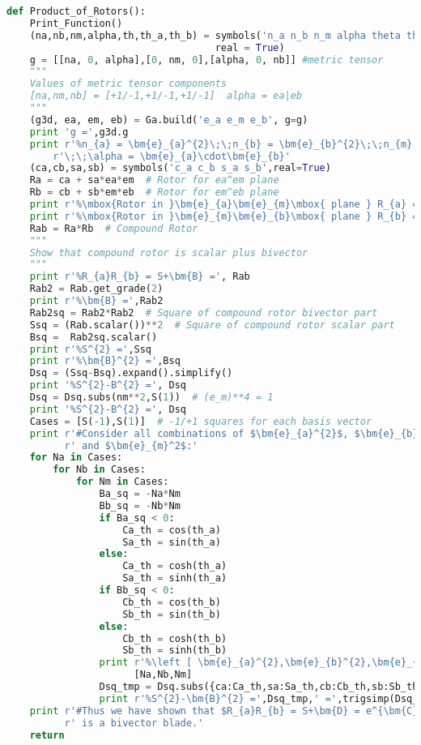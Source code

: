 \documentclass[10pt,fleqn]{report}
\begin{document}
\begin{lstlisting}[language=Python,showspaces=false,showstringspaces=false,backgroundcolor=\color{gray},frame=single]
def Product_of_Rotors():
    Print_Function()
    (na,nb,nm,alpha,th,th_a,th_b) = symbols('n_a n_b n_m alpha theta theta_a theta_b',\
                                    real = True)
    g = [[na, 0, alpha],[0, nm, 0],[alpha, 0, nb]] #metric tensor
    """
    Values of metric tensor components
    [na,nm,nb] = [+1/-1,+1/-1,+1/-1]  alpha = ea|eb
    """
    (g3d, ea, em, eb) = Ga.build('e_a e_m e_b', g=g)
    print 'g =',g3d.g
    print r'%n_{a} = \bm{e}_{a}^{2}\;\;n_{b} = \bm{e}_{b}^{2}\;\;n_{m} = \bm{e}_{m}^{2}'+\
        r'\;\;\alpha = \bm{e}_{a}\cdot\bm{e}_{b}'
    (ca,cb,sa,sb) = symbols('c_a c_b s_a s_b',real=True)
    Ra = ca + sa*ea*em  # Rotor for ea^em plane
    Rb = cb + sb*em*eb  # Rotor for em^eb plane
    print r'%\mbox{Rotor in }\bm{e}_{a}\bm{e}_{m}\mbox{ plane } R_{a} =',Ra
    print r'%\mbox{Rotor in }\bm{e}_{m}\bm{e}_{b}\mbox{ plane } R_{b} =',Rb
    Rab = Ra*Rb  # Compound Rotor
    """
    Show that compound rotor is scalar plus bivector
    """
    print r'%R_{a}R_{b} = S+\bm{B} =', Rab
    Rab2 = Rab.get_grade(2)
    print r'%\bm{B} =',Rab2
    Rab2sq = Rab2*Rab2  # Square of compound rotor bivector part
    Ssq = (Rab.scalar())**2  # Square of compound rotor scalar part
    Bsq =  Rab2sq.scalar()
    print r'%S^{2} =',Ssq
    print r'%\bm{B}^{2} =',Bsq
    Dsq = (Ssq-Bsq).expand().simplify()
    print '%S^{2}-B^{2} =', Dsq
    Dsq = Dsq.subs(nm**2,S(1))  # (e_m)**4 = 1
    print '%S^{2}-B^{2} =', Dsq
    Cases = [S(-1),S(1)]  # -1/+1 squares for each basis vector
    print r'#Consider all combinations of $\bm{e}_{a}^{2}$, $\bm{e}_{b}^{2}$'+\
          r' and $\bm{e}_{m}^2$:'
    for Na in Cases:
        for Nb in Cases:
            for Nm in Cases:
                Ba_sq = -Na*Nm
                Bb_sq = -Nb*Nm
                if Ba_sq < 0:
                    Ca_th = cos(th_a)
                    Sa_th = sin(th_a)
                else:
                    Ca_th = cosh(th_a)
                    Sa_th = sinh(th_a)
                if Bb_sq < 0:
                    Cb_th = cos(th_b)
                    Sb_th = sin(th_b)
                else:
                    Cb_th = cosh(th_b)
                    Sb_th = sinh(th_b)
                print r'%\left [ \bm{e}_{a}^{2},\bm{e}_{b}^{2},\bm{e}_{m}^2\right ] =',\
                      [Na,Nb,Nm]
                Dsq_tmp = Dsq.subs({ca:Ca_th,sa:Sa_th,cb:Cb_th,sb:Sb_th,na:Na,nb:Nb,nm:Nm})
                print r'%S^{2}-\bm{B}^{2} =',Dsq_tmp,' =',trigsimp(Dsq_tmp)
    print r'#Thus we have shown that $R_{a}R_{b} = S+\bm{D} = e^{\bm{C}}$ where $\bm{C}$'+\
          r' is a bivector blade.'
    return
\end{lstlisting}
\end{document}
